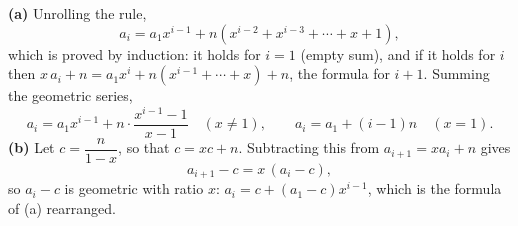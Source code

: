 \textbf{(a)} Unrolling the rule,
\[a_i=a_1x^{i-1}+n\left(x^{i-2}+x^{i-3}+\cdots+x+1\right),\]
which is proved by induction: it holds for $i=1$ (empty sum), and if it holds for $i$ then $x\,a_i+n=a_1x^i+n\left(x^{i-1}+\cdots+x\right)+n$, the formula for $i+1$. Summing the geometric series,
\[\boxed{a_i=a_1x^{i-1}+n\cdot\dfrac{x^{i-1}-1}{x-1}\quad(x\ne1),\qquad a_i=a_1+(i-1)n\quad(x=1).}\]
\textbf{(b)} Let $c=\dfrac{n}{1-x}$, so that $c=xc+n$. Subtracting this from $a_{i+1}=xa_i+n$ gives
\[a_{i+1}-c=x\,(a_i-c),\]
so $a_i-c$ is geometric with ratio $x$: $a_i=c+(a_1-c)x^{i-1}$, which is the formula of (a) rearranged.
